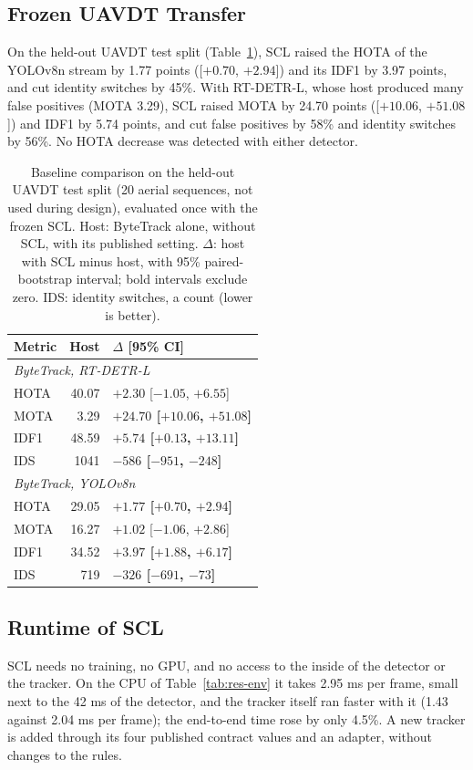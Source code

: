 \subsection{Frozen UAVDT Transfer}\label{sec:res-scl-uavdt}
On the held-out UAVDT test split (Table~\ref{tab:res-scl-uavdt}), SCL raised the HOTA of the YOLOv8n stream by 1.77 points ([$+0.70$, $+2.94$]) and its IDF1 by 3.97 points, and cut identity switches by 45\%. With RT-DETR-L, whose host produced many false positives (MOTA 3.29), SCL raised MOTA by 24.70 points ([$+10.06$, $+51.08$]) and IDF1 by 5.74 points, and cut false positives by 58\% and identity switches by 56\%. No HOTA decrease was detected with either detector.

\begin{table}[tbp]
\centering
\caption{Baseline comparison on the held-out UAVDT test split (20 aerial sequences, not used during design), evaluated once with the frozen SCL. Host: ByteTrack alone, without SCL, with its published setting. $\Delta$: host with SCL minus host, with 95\% paired-bootstrap interval; bold intervals exclude zero. IDS: identity switches, a count (lower is better).}
\label{tab:res-scl-uavdt}
\begin{tabular}{lrl}
\toprule
Metric & Host & $\Delta$ [95\% CI]\\
\midrule
\multicolumn{3}{l}{\textit{ByteTrack, RT-DETR-L} \cite{zhang2022bytetrack,zhao2024rtdetr}}\\
\quad HOTA & 40.07 & $+2.30$ [$-1.05$, $+6.55$]\\
\quad MOTA & 3.29 & \textbf{$+24.70$ [$+10.06$, $+51.08$]}\\
\quad IDF1 & 48.59 & \textbf{$+5.74$ [$+0.13$, $+13.11$]}\\
\quad IDS & 1041 & \textbf{$-586$ [$-951$, $-248$]}\\
\multicolumn{3}{l}{\textit{ByteTrack, YOLOv8n} \cite{zhang2022bytetrack,jocher2023yolov8}}\\
\quad HOTA & 29.05 & \textbf{$+1.77$ [$+0.70$, $+2.94$]}\\
\quad MOTA & 16.27 & $+1.02$ [$-1.06$, $+2.86$]\\
\quad IDF1 & 34.52 & \textbf{$+3.97$ [$+1.88$, $+6.17$]}\\
\quad IDS & 719 & \textbf{$-326$ [$-691$, $-73$]}\\
\bottomrule
\end{tabular}
\end{table}

\subsection{Runtime of SCL}\label{sec:res-scl-runtime}
SCL needs no training, no GPU, and no access to the inside of the detector or the tracker. On the CPU of Table~\ref{tab:res-env} it takes 2.95 ms per frame, small next to the 42 ms of the detector, and the tracker itself ran faster with it (1.43 against 2.04 ms per frame); the end-to-end time rose by only 4.5\%. A new tracker is added through its four published contract values and an adapter, without changes to the rules.

